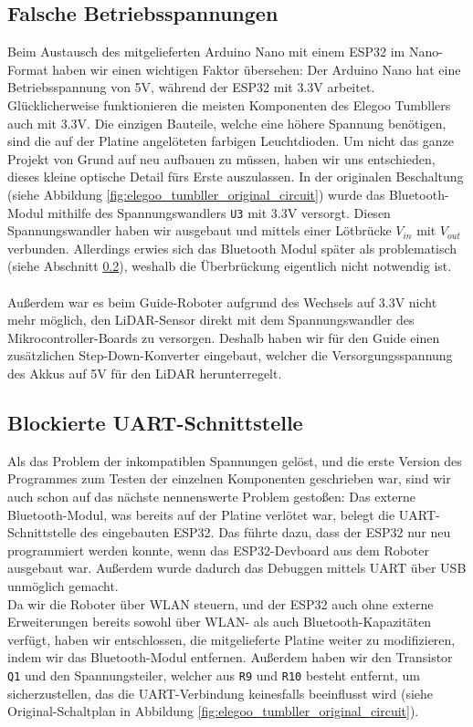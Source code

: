 \subsection{Falsche Betriebsspannungen}
\label{subsec:problem_betriebsspannungen}
Beim Austausch des mitgelieferten Arduino Nano mit einem ESP32 im Nano-Format haben wir einen wichtigen Faktor übersehen:
%
Der Arduino Nano hat eine Betriebsspannung von 5V,
während der ESP32 mit 3.3V arbeitet.
%
Glücklicherweise funktionieren die meisten Komponenten des Elegoo Tumbllers auch mit 3.3V.
%
Die einzigen Bauteile,
welche eine höhere Spannung benötigen,
sind die auf der Platine angelöteten farbigen Leuchtdioden.
%
Um nicht das ganze Projekt von Grund auf neu aufbauen zu müssen,
haben wir uns entschieden,
dieses kleine optische Detail fürs Erste auszulassen.
%
In der originalen Beschaltung (siehe Abbildung \ref{fig:elegoo_tumbller_original_circuit})
wurde das Bluetooth-Modul mithilfe des Spannungswandlers \texttt{U3} mit 3.3V versorgt.
%
Diesen Spannungswandler haben wir ausgebaut und mittels einer Lötbrücke $V_{in}$ mit $V_{out}$ verbunden.
Allerdings erwies sich das Bluetooth Modul später als problematisch (siehe Abschnitt \ref{subsec:problem_bluetooth_serial}),
weshalb die Überbrückung eigentlich nicht notwendig ist.
\\\\
Außerdem war es beim Guide-Roboter aufgrund des Wechsels auf 3.3V nicht mehr möglich,
den LiDAR-Sensor direkt mit dem Spannungswandler des Mikrocontroller-Boards zu versorgen.
%
Deshalb haben wir für den Guide einen zusätzlichen Step-Down-Konverter eingebaut,
welcher die Versorgungsspannung des Akkus auf 5V für den LiDAR herunterregelt.
\subsection{Blockierte UART-Schnittstelle}
\label{subsec:problem_bluetooth_serial}
Als das Problem der inkompatiblen Spannungen gelöst,
und die erste Version des Programmes zum Testen der einzelnen Komponenten geschrieben war,
sind wir auch schon auf das nächste nennenswerte Problem gestoßen:
%
Das externe Bluetooth-Modul,
was bereits auf der Platine verlötet war,
belegt die UART-Schnittstelle des eingebauten ESP32.
%
Das führte dazu, dass der ESP32 nur neu programmiert werden konnte,
wenn das ESP32-Devboard aus dem Roboter ausgebaut war.
%
Außerdem wurde dadurch das Debuggen mittels UART über USB unmöglich gemacht.
\\
Da wir die Roboter über WLAN steuern,
und der ESP32 auch ohne externe Erweiterungen bereits sowohl über WLAN- als auch Bluetooth-Kapazitäten verfügt,
haben wir entschlossen,
die mitgelieferte Platine weiter zu modifizieren,
indem wir das Bluetooth-Modul entfernen.
%
Außerdem haben wir den Transistor \texttt{Q1} und den Spannungsteiler,
welcher aus \texttt{R9} und \texttt{R10} besteht entfernt,
um sicherzustellen, das die UART-Verbindung keinesfalls beeinflusst wird
(siehe Original-Schaltplan in Abbildung \ref{fig:elegoo_tumbller_original_circuit}).


